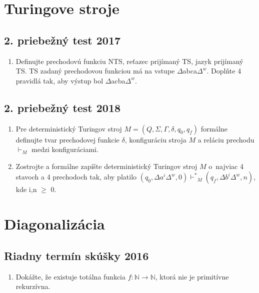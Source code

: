 \documentclass[11pt,a4paper]{article}
\begin{document}
	\section{Turingove stroje}

		\subsection{2. priebežný test 2017}

		\begin{enumerate}
			\item Definujte prechodovú funkciu NTS, reťazec prijímaný TS, jazyk prijímaný TS. TS zadaný prechodovou funkciou má na vstupe $\Delta$abca$\Delta^{w}$. Doplňte 4 pravidlá tak, aby výstup bol $\Delta$acba$\Delta^w$.
		\end{enumerate}

		\subsection{2. priebežný test 2018}

		\begin{enumerate}
			\item Pre deterministický Turingov stroj $M = (Q, \Sigma, \Gamma, \delta, q_0, q_f)$ formálne definujte tvar prechodovej funkcie $\delta$, konfiguráciu stroja $M$ a reláciu prechodu $\vdash_M$ medzi konfiguráciami.

			\item Zostrojte a formálne zapíšte deterministický Turingov stroj $M$ o~najviac 4 stavoch a 4 prechodoch tak, aby platilo $(q_0, \Delta a^i\Delta^w, 0) {\vdash^*}_M (q_f, \Delta b^i\Delta^w, n)$, kde i,n $\geq$ 0.
		\end{enumerate}

	\section{Diagonalizácia}
	
		\subsection{Riadny termín skúšky 2016}
		
		\begin{enumerate}
			\item  Dokážte, že existuje totálna funkcia $f: \mathbb{N} \rightarrow \mathbb{N}$, ktorá nie je primitívne rekurzívna.
		\end{enumerate}
	
\end{document}
